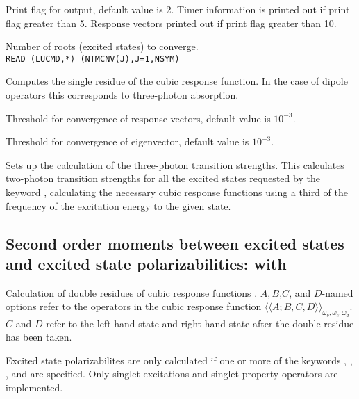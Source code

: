 \begin{description}
\item{}
Print flag for output, default value is 2. Timer information is printed
out if print flag greater than 5. Response vectors printed out if
print flag greater than 10.

\item{}
Number of roots (excited states) to converge. \\
\verb|READ (LUCMD,*) (NTMCNV(J),J=1,NSYM)|\\

\item{}
Computes the single residue of the cubic
response function.
In the case of dipole operators this corresponds to
three-photon absorption.

\item{}
Threshold for convergence of response vectors, default value is $10^{-3}$.

\item{}
Threshold for convergence of eigenvector, default value is $10^{-3}$.

\item{}
Sets up the calculation of the three-photon transition strengths. This
calculates two-photon transition strengths for all the excited states
requested by the keyword , calculating the necessary
cubic response functions using  a third of the frequency of the
excitation energy to the given state.

\end{description}


\subsection{Second order moments between excited states and excited state polarizabilities:
 with }
Calculation of double residues of
cubic response functions
\cite{pndjovhacpl242,djpnhajcp105,pndjhapdkrthhkcpl253}.
$A,B$,$C$, and $D$-named options refer to the operators in the cubic
response function
$\langle\!\langle A;B,C,D \rangle\!\rangle_{\omega_b,\omega_c,\omega_d}$.
$C$ and $D$ refer to the left hand state and right hand state
after the double residue has been taken.

Excited state polarizabilites are only calculated if one or more of the keywords
, , , and 
are specified.
Only singlet excitations and singlet property operators are implemented.

